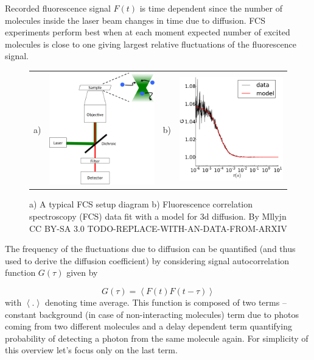 \documentclass{doctoral}
\begin{document}
Recorded fluorescence signal $F(t)$ is time dependent since the number of molecules inside the laser beam changes in time due to diffusion. FCS experiments perform best when at each moment expected number of excited molecules is close to one giving largest relative fluctuations of the fluorescence signal.

\begin{figure}[h]
    \centering
    \begin{tabular}{llll}
    a) &
    \includegraphics[height=0.3\linewidth,valign=t]{figures/fcs_setup.png} &
    b) &
    \includegraphics[height=0.32\linewidth,valign=t]{figures/fcs_data_and_fit.pdf}
    \end{tabular}
    
    \caption{a) A typical FCS setup diagram  b) Fluorescence correlation spectroscopy (FCS) data fit with a model for 3d diffusion. By Mllyjn CC BY-SA 3.0 TODO-REPLACE-WITH-AN-DATA-FROM-ARXIV}
    \label{fig:fcs_diagram}
\end{figure}

The frequency of the fluctuations due to diffusion can be quantified (and thus used to derive the diffusion coefficient) by considering signal autocorrelation function $G(\tau)$ given by

\begin{equation}
    G(\tau) = \left< F(t) F(t-\tau) \right>
\end{equation}
with $\left< . \right>$ denoting time average. This function is composed of two terms -- constant background (in case of non-interacting molecules) term due to photos coming from two different molecules and a delay dependent term quantifying probability of detecting a photon from the same molecule again. For simplicity of this overview let's focus only on the last term.
\end{document}
